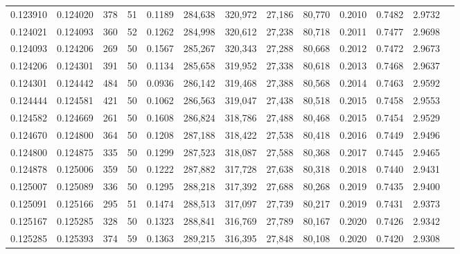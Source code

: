 \begin{tabular}{rrrrrrrrrrrrr}
0.123910 & 0.124020 &   378 &  51 &                                     0.1189 & 284,638 & 320,972 &  27,186 &  80,770 & 0.2010 & 0.7482 & 2.9732 \\
0.124021 & 0.124093 &   360 &  52 &                                     0.1262 & 284,998 & 320,612 &  27,238 &  80,718 & 0.2011 & 0.7477 & 2.9698 \\
0.124093 & 0.124206 &   269 &  50 &                                     0.1567 & 285,267 & 320,343 &  27,288 &  80,668 & 0.2012 & 0.7472 & 2.9673 \\
0.124206 & 0.124301 &   391 &  50 &                                     0.1134 & 285,658 & 319,952 &  27,338 &  80,618 & 0.2013 & 0.7468 & 2.9637 \\
0.124301 & 0.124442 &   484 &  50 &                                     0.0936 & 286,142 & 319,468 &  27,388 &  80,568 & 0.2014 & 0.7463 & 2.9592 \\
0.124444 & 0.124581 &   421 &  50 &                                     0.1062 & 286,563 & 319,047 &  27,438 &  80,518 & 0.2015 & 0.7458 & 2.9553 \\
0.124582 & 0.124669 &   261 &  50 &                                     0.1608 & 286,824 & 318,786 &  27,488 &  80,468 & 0.2015 & 0.7454 & 2.9529 \\
0.124670 & 0.124800 &   364 &  50 &                                     0.1208 & 287,188 & 318,422 &  27,538 &  80,418 & 0.2016 & 0.7449 & 2.9496 \\
0.124800 & 0.124875 &   335 &  50 &                                     0.1299 & 287,523 & 318,087 &  27,588 &  80,368 & 0.2017 & 0.7445 & 2.9465 \\
0.124878 & 0.125006 &   359 &  50 &                                     0.1222 & 287,882 & 317,728 &  27,638 &  80,318 & 0.2018 & 0.7440 & 2.9431 \\
0.125007 & 0.125089 &   336 &  50 &                                     0.1295 & 288,218 & 317,392 &  27,688 &  80,268 & 0.2019 & 0.7435 & 2.9400 \\
0.125091 & 0.125166 &   295 &  51 &                                     0.1474 & 288,513 & 317,097 &  27,739 &  80,217 & 0.2019 & 0.7431 & 2.9373 \\
0.125167 & 0.125285 &   328 &  50 &                                     0.1323 & 288,841 & 316,769 &  27,789 &  80,167 & 0.2020 & 0.7426 & 2.9342 \\
0.125285 & 0.125393 &   374 &  59 &                                     0.1363 & 289,215 & 316,395 &  27,848 &  80,108 & 0.2020 & 0.7420 & 2.9308 \\

\end{tabular}
